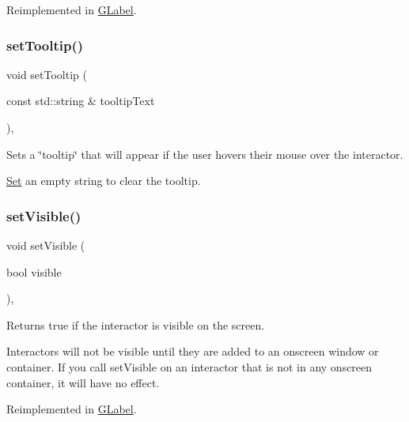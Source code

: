 Reimplemented in \mbox{\hyperlink{classGLabel_a0fe8cce1a80750f36fa14ee99ca34014}{G\+Label}}.

\mbox{\label{classGInteractor_a039e0e49beaecc275efce02d416acea8}} 
\subsubsection{\texorpdfstring{set\+Tooltip()}{setTooltip()}}
{\footnotesize\ttfamily void set\+Tooltip (\begin{DoxyParamCaption}\item[{const std\+::string \&}]{tooltip\+Text }\end{DoxyParamCaption})\hspace{0.3cm}{\ttfamily [virtual]}, {\ttfamily [inherited]}}



Sets a \char`\"{}tooltip\char`\"{} that will appear if the user hovers their mouse over the interactor. 

\mbox{\hyperlink{classSet}{Set}} an empty string to clear the tooltip. \mbox{\label{classGInteractor_a18e44e30b31525a243960ca3928125aa}} 
\subsubsection{\texorpdfstring{set\+Visible()}{setVisible()}}
{\footnotesize\ttfamily void set\+Visible (\begin{DoxyParamCaption}\item[{bool}]{visible }\end{DoxyParamCaption})\hspace{0.3cm}{\ttfamily [virtual]}, {\ttfamily [inherited]}}



Returns true if the interactor is visible on the screen. 

Interactors will not be visible until they are added to an onscreen window or container. If you call set\+Visible on an interactor that is not in any onscreen container, it will have no effect. 

Reimplemented in \mbox{\hyperlink{classGLabel_a95c2a1221e6c59e9de544054963b4b18}{G\+Label}}.

